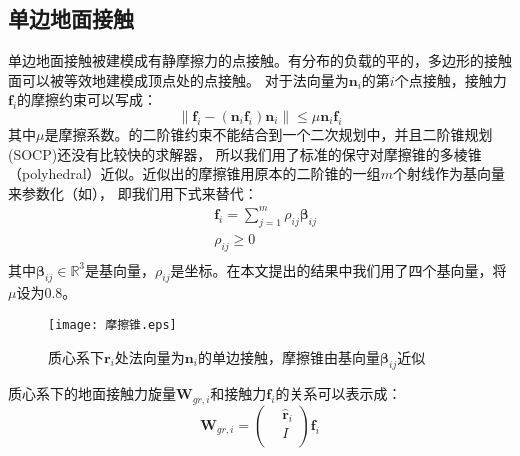 \subsection{单边地面接触}
单边地面接触被建模成有静摩擦力的点接触。有分布的负载的平的，多边形的接触面可以被等效地建模成顶点处的点接触。
对于法向量为${{\boldsymbol{n}}_{i}}$的第$i$个点接触，接触力${{\boldsymbol{f}}_{i}}$的摩擦约束可以写成：
\begin{equation}
    \label{equ:friction_cone}
    \left\| {{\boldsymbol{f}}_{i}}-({{\boldsymbol{n}}_{i}}{{\boldsymbol{f}}_{i}}){{\boldsymbol{n}}_{i}} \right\|\le \mu {{\boldsymbol{n}}_{i}}{{\boldsymbol{f}}_{i}}
\end{equation}
其中$\mu$是摩擦系数。的二阶锥约束不能结合到一个二次规划中，并且二阶锥规划(SOCP)还没有比较快的求解器，
所以我们用了标准的保守对摩擦锥的多棱锥（polyhedral）近似。近似出的摩擦锥用原本的二阶锥的一组$m$个射线作为基向量来参数化（如），
即我们用下式来替代：
\begin{equation}
    \label{equ:friction_para}
    \begin{aligned}
        & {{\boldsymbol{f}}_{i}}=\sum\limits_{j=1}^{m}{{{\rho }_{ij}}{{\boldsymbol{\beta}}_{ij}}} \\ 
       & {{\rho }_{ij}}\ge 0 \\ 
      \end{aligned}      
\end{equation}
其中$\boldsymbol{\beta}_{ij} \in \mathbb{R}^3$是基向量，$\rho_{ij}$是坐标。在本文提出的结果中我们用了四个基向量，将$\mu$设为0.8。
\begin{figure}[htbp]
    \centering
    \texttt{[image: 摩擦锥.eps]}
    \caption{\label{fig:friction_cone}质心系下$\boldsymbol{r}_{i}$处法向量为${{\boldsymbol{n}}_{i}}$的单边接触，摩擦锥由基向量$\boldsymbol{\beta}_{ij}$近似}
\end{figure}
质心系下的地面接触力旋量${{\boldsymbol{W}}_{gr,i}}$和接触力${{\boldsymbol{f}}_{i}}$的关系可以表示成：
\begin{equation}
    \label{equ:contact_wrench}
    {\boldsymbol{W}_{gr,i}}=\left( \begin{aligned}
        & {{{\hat{\boldsymbol{r}}}}_{i}} \\ 
       & I \\ 
      \end{aligned} \right){\boldsymbol{f}_{i}}      
\end{equation}
